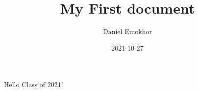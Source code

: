 \documentclass{article}
\title{My First document}
\date{ 2021-10-27}
\author{ Daniel Emokhor}
\begin{document}
	\maketitle
	\newpage
	Hello Class of 2021!
\end{document}
